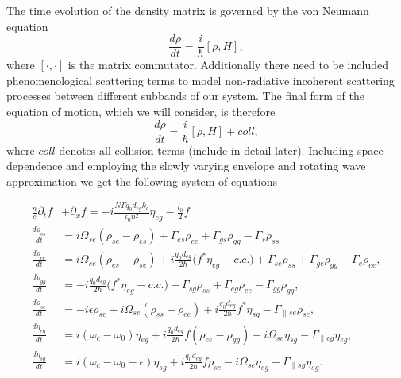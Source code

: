 \documentclass[]{spie}  %
\begin{document}
 The time evolution of the density matrix is governed by the von Neumann equation
 \begin{equation}
 \frac{d \rho}{dt} = \frac{i}{\hbar} [\rho,H],
 \end{equation}
 where $[\cdot,\cdot]$ is the matrix commutator. Additionally there need to be included phenomenological scattering terms to model non-radiative incoherent scattering processes between different subbands of our system. The final form of the equation of motion, which we will consider, is therefore
 \begin{equation}
 \frac{d \rho}{dt} = \frac{i}{\hbar} [\rho,H] + coll,  
 \end{equation}
 where $coll$ denotes all collision terms (include in detail later). Including space dependence and employing the slowly varying envelope and rotating wave approximation we get the following system of equations
 \begin{center}
 		\begin{subequations}
 			\label{eq:threelevelmodel}
 			\begin{align}
 			\frac{n}{c}\partial_t f &+ \partial_{x}f= -i\frac{N \Gamma q_0d_{eg} k_c}{\epsilon_0 n^2} \eta_{eg} - \frac{l_0}{2} f \label{eq:rtwave} \\
 			\frac{d \rho_{ss}}{d t} 	&= i\Omega_{se} (\rho_{se} - \rho_{es})+ \Gamma_{es}\rho_{ee} + \Gamma_{gs}\rho_{gg}  -\Gamma_s\rho_{ss} \\
 			\frac{d \rho_{ee}}{d t}	& = i\Omega_{se} (\rho_{es} - \rho_{se}) + i\frac{q_0d_{eg}}{2\hbar} \big (f^*\eta_{eg}- c.c. \big ) 
 			+\Gamma_{se}\rho_{ss} + \Gamma_{ge}\rho_{gg} - \Gamma_e \rho_{ee},  \\
 			\frac{d \rho_{gg}}{d t}  &= -i\frac{q_0d_{eg}}{2\hbar} \big (f^*\eta_{eg} - c.c. \big )  + \Gamma_{sg}\rho_{ss}  +  \Gamma_{eg}\rho_{ee} - \Gamma_{gg}\rho_{gg} , \\
 			\frac{d \rho_{se}}{d t}  &= -i\epsilon\rho_{se} +i \Omega_{se}(\rho_{ss} - \rho_{ee}) +i\frac{q_0d_{eg}}{2 \hbar}f^*\eta_{sg}- \Gamma_{\parallel se} \rho_{se},  \\
 			\frac{d \eta_{eg}}{d t}   &= i(\omega_c - \omega_0)\eta_{eg} + i \frac{q_0d_{eg}}{2\hbar}f(\rho_{ee}-\rho_{gg})  - i\Omega_{se}\eta_{sg} - \Gamma_{\parallel eg}\eta_{eg}, \\
 			\frac{d \eta_{sg}}{d t} &= i(\omega_c - \omega_0-\epsilon)\eta_{sg} +i \frac{q_0d_{eg}}{2\hbar}f\rho_{se} - i\Omega_{se}\eta_{eg} - \Gamma_{\parallel sg}\eta_{sg}.
 			\end{align}
 		\end{subequations}
 \end{center}
\end{document}
